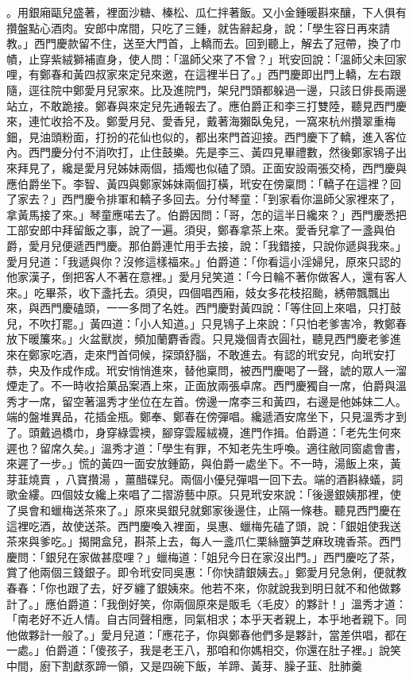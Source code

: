 。用銀廂甌兒盛著，裡面沙糖、榛松、瓜仁拌著飯。又小金鍾暖斟來釀，下人俱有攢盤點心酒肉。安郎中席間，只吃了三鍾，就告辭起身，說：「學生容日再來請教。」西門慶款留不住，送至大門首，上轎而去。回到聽上，解去了冠帶，換了巾幘，止穿紫絨獅補直身，使人問：「溫師父來了不曾？」玳安回說：「溫師父未回家哩，有鄭春和黃四叔家來定兒來邀，在這裡半日了。」西門慶即出門上轎，左右跟隨，逕往院中鄭愛月兒家來。比及進院門，架兒門頭都躲過一邊，只該日俳長兩邊站立，不敢跪接。鄭春與來定兒先通報去了。應伯爵正和李三打雙陸，聽見西門慶來，連忙收拾不及。鄭愛月兒、愛香兒，戴著海獺臥兔兒，一窩來杭州攢翠重梅鈿，見油頭粉面，打扮的花仙也似的，都出來門首迎接。西門慶下了轎，進入客位內。西門慶分付不消吹打，止住鼓樂。先是李三、黃四見畢禮數，然後鄭家鴇子出來拜見了，纔是愛月兒姊妹兩個，插燭也似磕了頭。正面安設兩張交椅，西門慶與應伯爵坐下。李智、黃四與鄭家姊妹兩個打橫，玳安在傍稟問：「轎子在這裡？回了家去？」西門慶令排軍和轎子多回去。分付琴童：「到家看你溫師父家裡來了，拿黃馬接了來。」琴童應喏去了。伯爵因問：「哥，怎的這半日纔來？」西門慶悉把工部安郎中拜留飯之事，說了一遍。須臾，鄭春拿茶上來。愛香兒拿了一盞與伯爵，愛月兒便遞西門慶。那伯爵連忙用手去接，說：「我錯接，只說你遞與我來。」愛月兒道：「我遞與你？沒修這樣福來。」伯爵道：「你看這小淫婦兒，原來只認的他家漢子，倒把客人不著在意裡。」愛月兒笑道：「今日輪不著你做客人，還有客人來。」吃畢茶，收下盞托去。須臾，四個唱西廂，妓女多花枝招颱，綉帶飄飄出來，與西門慶磕頭，一一多問了名姓。西門慶對黃四說：「等住回上來唱，只打鼓兒，不吹打罷。」黃四道：「小人知道。」只見鴇子上來說：「只怕老爹害冷，教鄭春放下暖簾來。」火盆獸炭，頻加蘭麝香霞。只見幾個青衣圓社，聽見西門慶老爹進來在鄭家吃酒，走來門首伺候，探頭舒腦，不敢進去。有認的玳安兒，向玳安打恭，央及作成作成。玳安悄悄進來，替他稟問，被西門慶喝了一聲，諕的眾人一溜煙走了。不一時收拾菓品案酒上來，正面放兩張卓席。西門慶獨自一席，伯爵與溫秀才一席，留空著溫秀才坐位在左首。傍邊一席李三和黃四，右邊是他姊妹二人。端的盤堆異品，花插金瓶。鄭奉、鄭春在傍彈唱。纔遞酒安席坐下，只見溫秀才到了。頭戴過橋巾，身穿綠雲襖，腳穿雲履絨襪，進門作揖。伯爵道：「老先生何來遲也？留席久矣。」溫秀才道：「學生有罪，不知老先生呼喚。適往敝同窗處會書，來遲了一步。」慌的黃四一面安放鍾筯，與伯爵一處坐下。不一時，湯飯上來，黃芽韮燒賣 ，八寶攢湯 ，薑醋碟兒。兩個小優兒彈唱一回下去。端的酒斟綠蟻，詞歌金縷。四個妓女纔上來唱了二摺游藝中原。只見玳安來說：「後邊銀姨那裡，使了吳會和蠟梅送茶來了。」原來吳銀兒就鄭家後邊住，止隔一條巷。聽見西門慶在這裡吃酒，故使送茶。西門慶喚入裡面，吳惠、蠟梅先磕了頭，說：「銀姐使我送茶來與爹吃。」揭開盒兒，斟茶上去，每人一盞爪仁栗絲鹽笋芝麻玫瑰香茶。西門慶問：「銀兒在家做甚麼哩？」蠟梅道：「姐兒今日在家沒出門。」西門慶吃了茶，賞了他兩個三錢銀子。即令玳安同吳惠：「你快請銀姨去。」鄭愛月兒急俐，便就教春春：「你也跟了去，好歹纏了銀姨來。他若不來，你就說我到明日就不和他做夥計了。」應伯爵道：「我倒好笑，你兩個原來是販毛〈毛皮〉的夥計！」溫秀才道：「南老好不近人情。自古同聲相應，同氣相求；本乎天者親上，本乎地者親下。同他做夥計一般了。」愛月兒道：「應花子，你與鄭春他們多是夥計，當差供唱，都在一處。」伯爵道：「傻孩子，我是老王八，那咱和你媽相交，你還在肚子裡。」說笑中間，廚下割獻豕蹄一領，又是四碗下飯，羊蹄、黃芽、臊子韮、肚肺羹 